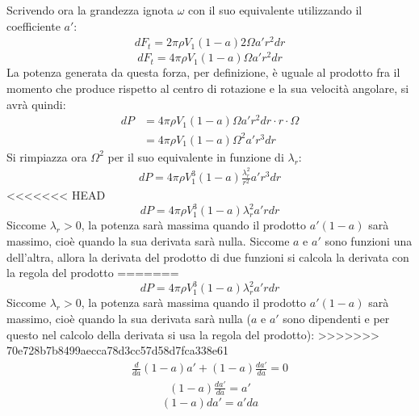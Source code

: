 Scrivendo ora la grandezza ignota $\omega$ con il suo equivalente utilizzando il coefficiente $a'$:
\begin{align*}
dF_t = 2 \pi \rho V_1 \left( 1- a \right) 2 \Omega a' r^2 dr
\end{align*}
\begin{equation}\label{eq:dftfin}
dF_t = 4 \pi \rho V_1 \left(1-a \right) \Omega a' r^2 dr
\end{equation}
La potenza generata da questa forza, per definizione, è uguale al prodotto fra il momento che produce rispetto al centro di rotazione e la sua velocità angolare, si avrà quindi:
\begin{align*}
dP &= 4 \pi \rho V_1 \left( 1-a \right) \Omega a' r^2 dr \cdot r \cdot \Omega \\
&= 4 \pi \rho V_1 \left( 1-a \right) \Omega^2 a' r^3 dr
\end{align*}
Si rimpiazza ora $\Omega^2$ per il suo equivalente in funzione di $\lambda_r$:
\begin{align*}
dP = 4 \pi \rho V_1^3 \left( 1- a \right) \frac{\lambda_r^2}{r^2} a' r^3 dr
\end{align*}
<<<<<<< HEAD
\begin{equation}\label{eq:dP}
dP = 4 \pi \rho V_1^3 \left( 1 - a \right) \lambda_r^2 a' r dr
\end{equation}
Siccome $\lambda_r > 0$, la potenza sarà massima quando il prodotto $a' \left( 1- a \right)$ sarà massimo, cioè quando la sua derivata sarà nulla. Siccome $a$ e $a'$ sono funzioni una dell'altra, allora la derivata del prodotto di due funzioni si calcola la derivata con la regola del prodotto
=======
\begin{equation}
	 dP = 4 \pi \rho V_1^3 \left( 1 - a \right) \lambda_r^2 a' r dr
	 \label{eq:dP}
\end{equation}
Siccome $\lambda_r > 0$, la potenza sarà massima quando il prodotto $a' \left( 1- a \right)$ sarà massimo, cioè quando la sua derivata sarà nulla ($a$ e $a'$ sono dipendenti e per questo nel calcolo della derivata si usa la regola del prodotto):
>>>>>>> 70e728b7b8499aecca78d3cc57d58d7fca338e61
\begin{align*}
\frac{d}{da} \left( 1-a \right) a' + \left( 1 -a \right) \frac{da'}{da} = 0
\end{align*}
\begin{align*}
\left( 1- a \right) \frac{da'}{da} = a'
\end{align*}
\begin{equation}\label{eq:aa'}
\left(1 - a \right) da' = a' da
\end{equation}
